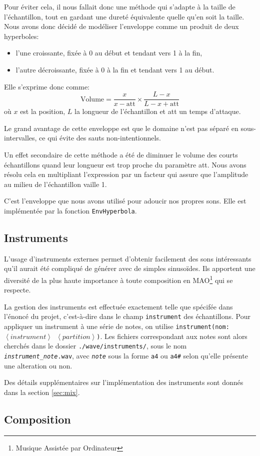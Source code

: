\documentclass[a4paper,12pt]{article}
\begin{document}
\begin{itemize}
        Pour éviter cela, il nous fallait donc une méthode qui s'adapte
        à la taille de l'échantillon, tout en gardant une dureté équivalente
        quelle qu'en soit la taille.
        Nous avons donc décidé de modéliser l'enveloppe comme un produit
        de deux hyperboles:
        \begin{itemize}
            \item l'une croissante,
                fixée à 0 au début et tendant vers 1 à la fin,
            \item l'autre décroissante,
                fixée à 0 à la fin et tendant vers 1 au début.
        \end{itemize}
        Elle s'exprime donc comme:
        \[
            \mbox{Volume} = \frac{x}{x-\mbox{att}} \times
                \frac{L-x}{L-x+\mbox{att}}
        \]
        où $x$ est la position, $L$ la longueur de l'échantillon et
        att un temps d'attaque.
        
        Le grand avantage de cette enveloppe est que le domaine n'est pas
        séparé en sous-intervalles, ce qui évite des sauts non-intentionnels.
        
        Un effet secondaire de cette méthode a été de diminuer le volume des
        courts échantillons quand leur longueur est trop proche du paramètre
        att.
        Nous avons résolu cela en multipliant l'expression par un facteur
        qui assure que l'amplitude au milieu de l'échantillon vaille 1.
        
        C'est l'enveloppe que nous avons utilisé pour adoucir nos propres sons.
        Elle est implémentée par la fonction \texttt{EnvHyperbola}.
\end{itemize}

\subsection{Instruments}

L'usage d'instruments externes permet d'obtenir facilement des sons intéressants qu'il aurait été compliqué de générer avec de simples sinusoïdes. Ils apportent une diversité de la plus haute importance à toute composition en MAO\footnote{Musique Assistée par Ordinateur} qui se respecte.

La gestion des instruments est effectuée exactement telle que spécifée dans l'énoncé du projet, c'est-à-dire dans le champ \texttt{instrument} des échantillons. Pour appliquer un instrument à une série de notes, on utilise \texttt{instrument(nom:$\left<instrument\right>$ $\left<partition\right>$)}. Les fichiers correspondant aux notes sont alors cherchés dans le dossier \texttt{./wave/instruments/}, sous le nom \texttt{\textit{instrument}\_\textit{note}.wav}, avec \texttt{\textit{note}} sous la forme \texttt{a4} ou \texttt{a4\#} selon qu'elle présente une alteration ou non.

Des détails supplémentaires sur l'implémentation des instruments sont donnés dans la section \ref{sec:mix}.

\subsection{Composition}
\end{document}
